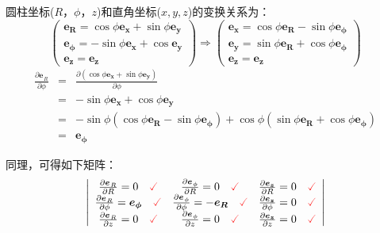 \documentclass[UTF8]{ctexart}
\newcommand{\tmcolor}[2]{{\color{#1}{#2}}}
\newcommand{\tmmathbf}[1]{\ensuremath{\boldsymbol{#1}}}
\begin{document}
圆柱坐标($R$，$\phi$，$z$)和直角坐标($x, y,
z$)的变换关系为：
\[ \left(\begin{array}{c}
     \tmmathbf{e_R} = \cos \phi \tmmathbf{e_x} + \sin \phi \tmmathbf{e_y}\\
     \tmmathbf{e_{\phi}} = - \sin \phi \tmmathbf{e_x} + \cos \tmmathbf{e_y}\\
     \tmmathbf{e_z} = \tmmathbf{e_z}
   \end{array}\right) \Longrightarrow \left(\begin{array}{c}
     \tmmathbf{e_x} = \cos \phi \tmmathbf{e_R} - \sin \phi
     \tmmathbf{e_{\phi}}\\
     \tmmathbf{e_y} = \sin \phi \tmmathbf{e_R} + \cos \phi
     \tmmathbf{e_{\phi}}\\
     \tmmathbf{e_z} = \tmmathbf{e_z}
   \end{array}\right) \]
\begin{eqnarray*}
  \frac{\partial \tmmathbf{e_{}}_R}{\partial \phi} & = & \frac{\partial (\cos
  \phi \tmmathbf{e_x} + \sin \phi \tmmathbf{e_y})}{\partial \phi}\\
  & = & - \sin \phi \tmmathbf{e_x} + \cos \phi \tmmathbf{e_y}\\
  & = & - \sin \phi (\cos \phi \tmmathbf{e_R} - \sin \phi
  \tmmathbf{e_{\phi}}) + \cos \phi (\sin \phi \tmmathbf{e_R} + \cos \phi
  \tmmathbf{e_{\phi}})\\
  & = & \tmmathbf{e_{\phi}}
\end{eqnarray*}


同理，可得如下矩阵：
\begin{equation}\label{eq:eq46}
  \left|\begin{array}{ccc}
    \frac{\partial \tmmathbf{e_{}}_R}{\partial R} = 0 \quad
    \tmcolor{red}{\checked} & \frac{\partial \tmmathbf{e_{}}_{\phi}}{\partial
    R} = 0 \quad \tmcolor{red}{\checked} & \frac{\partial
    \tmmathbf{e_z}}{\partial R} = 0 \quad \tmcolor{red}{\checked}\\
    \frac{\partial \tmmathbf{e_{}}_R}{\partial \phi} = \tmmathbf{e_{\phi}}
    \quad \tmcolor{red}{\checked} & \frac{\partial
    \tmmathbf{e_{}}_{\phi}}{\partial \phi} = - \tmmathbf{e_R} \quad
    \tmcolor{red}{\checked} & \frac{\partial \tmmathbf{e_z}}{\partial \phi} =
    0 \quad \tmcolor{red}{\checked}\\
    \frac{\partial \tmmathbf{e_{}}_R}{\partial z} = 0 \quad \tmcolor{red}{}
    \tmcolor{red}{\checked} & \frac{\partial \tmmathbf{e_{}}_{\phi}}{\partial
    z} = 0 \quad \tmcolor{red}{\checked} & \frac{\partial
    \tmmathbf{e_z}}{\partial z} = 0 \quad \tmcolor{red}{\checked}
  \end{array}\right|
\end{equation}
\end{document}
